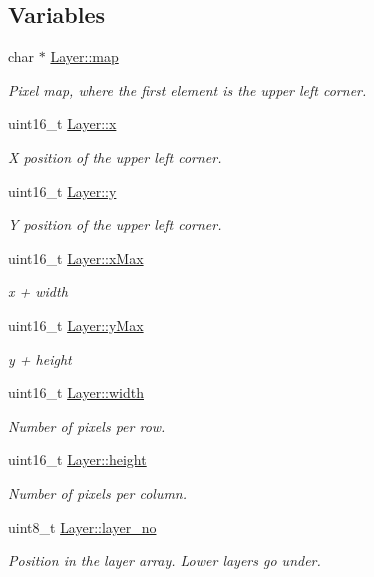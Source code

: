 \subsection*{Variables}
\begin{DoxyCompactItemize}
\item 
char $\ast$ \mbox{\hyperlink{group__layer_ga4439f4ca4c45e80cb99cf0445226a1c7}{Layer\+::map}}
\begin{DoxyCompactList}\small\item\em Pixel map, where the first element is the upper left corner. \end{DoxyCompactList}\item 
uint16\+\_\+t \mbox{\hyperlink{group__layer_ga93492d1dfe4b2ba659366efc048f4aa6}{Layer\+::x}}
\begin{DoxyCompactList}\small\item\em X position of the upper left corner. \end{DoxyCompactList}\item 
uint16\+\_\+t \mbox{\hyperlink{group__layer_ga7748abe8164b906fa159c0d57c7b0909}{Layer\+::y}}
\begin{DoxyCompactList}\small\item\em Y position of the upper left corner. \end{DoxyCompactList}\item 
uint16\+\_\+t \mbox{\hyperlink{group__layer_gabab5e77cc86413440c0a9f99e851269d}{Layer\+::x\+Max}}
\begin{DoxyCompactList}\small\item\em x + width \end{DoxyCompactList}\item 
uint16\+\_\+t \mbox{\hyperlink{group__layer_ga005d97fb2216101a65f274f4e8d609d9}{Layer\+::y\+Max}}
\begin{DoxyCompactList}\small\item\em y + height \end{DoxyCompactList}\item 
uint16\+\_\+t \mbox{\hyperlink{group__layer_ga9d1e4ca46204961e88006f131c697e97}{Layer\+::width}}
\begin{DoxyCompactList}\small\item\em Number of pixels per row. \end{DoxyCompactList}\item 
uint16\+\_\+t \mbox{\hyperlink{group__layer_ga55165612a9f4da7933dde862c7a54406}{Layer\+::height}}
\begin{DoxyCompactList}\small\item\em Number of pixels per column. \end{DoxyCompactList}\item 
uint8\+\_\+t \mbox{\hyperlink{group__layer_ga0c56f7ad3a85bd2173f52e11176f791c}{Layer\+::layer\+\_\+no}}
\begin{DoxyCompactList}\small\item\em Position in the layer array. Lower layers go under. \end{DoxyCompactList}\end{DoxyCompactItemize}


